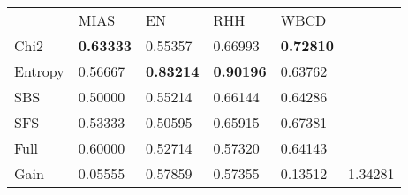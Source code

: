 \begin{tabular}{|l|l|l|l|l|l}
\cline{1-5}
        & MIAS              & EN                & RHH               & WBCD      &         \\
\cline{1-5}
Chi2    & \textbf{0.63333}  & 0.55357           & 0.66993           & \textbf{0.72810}  &         \\
Entropy & 0.56667           & \textbf{0.83214}  & \textbf{0.90196}  & 0.63762           &         \\
SBS     & 0.50000           & 0.55214           & 0.66144           & 0.64286           &         \\
SFS     & 0.53333           & 0.50595           & 0.65915           & 0.67381           &         \\
Full    & 0.60000           & 0.52714           & 0.57320           & 0.64143 \\
\cline{1-5}
\cline{1-5}
Gain    & 0.05555           & 0.57859           & 0.57355           & 0.13512           & 1.34281 \\
\cline{1-5}
\end{tabular}
